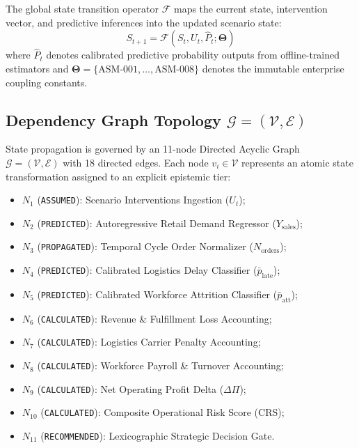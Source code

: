\documentclass[journal]{IEEEtran}
\begin{document}
The global state transition operator $\mathcal{F}$ maps the current state, intervention vector, and predictive inferences into the updated scenario state:
\begin{equation}
S_{t+1} = \mathcal{F}(S_t, U_t, \hat{P}_t; \bm{\Theta})
\end{equation}
where $\hat{P}_t$ denotes calibrated predictive probability outputs from offline-trained estimators and $\bm{\Theta} = \{\text{ASM-001}, \dots, \text{ASM-008}\}$ denotes the immutable enterprise coupling constants.

\subsection{Dependency Graph Topology $\mathcal{G} = (\mathcal{V}, \mathcal{E})$}
State propagation is governed by an 11-node Directed Acyclic Graph $\mathcal{G} = (\mathcal{V}, \mathcal{E})$ with 18 directed edges. Each node $v_i \in \mathcal{V}$ represents an atomic state transformation assigned to an explicit epistemic tier:
\begin{itemize}
    \item $N_1$ (\texttt{ASSUMED}): Scenario Interventions Ingestion ($U_t$);
    \item $N_2$ (\texttt{PREDICTED}): Autoregressive Retail Demand Regressor ($Y_{\text{sales}}$);
    \item $N_3$ (\texttt{PROPAGATED}): Temporal Cycle Order Normalizer ($N_{\text{orders}}$);
    \item $N_4$ (\texttt{PREDICTED}): Calibrated Logistics Delay Classifier ($\bar{p}_{\text{late}}$);
    \item $N_5$ (\texttt{PREDICTED}): Calibrated Workforce Attrition Classifier ($\bar{p}_{\text{att}}$);
    \item $N_6$ (\texttt{CALCULATED}): Revenue \& Fulfillment Loss Accounting;
    \item $N_7$ (\texttt{CALCULATED}): Logistics Carrier Penalty Accounting;
    \item $N_8$ (\texttt{CALCULATED}): Workforce Payroll \& Turnover Accounting;
    \item $N_9$ (\texttt{CALCULATED}): Net Operating Profit Delta ($\Delta \Pi$);
    \item $N_{10}$ (\texttt{CALCULATED}): Composite Operational Risk Score ($\text{CRS}$);
    \item $N_{11}$ (\texttt{RECOMMENDED}): Lexicographic Strategic Decision Gate.
\end{itemize}
\end{document}
